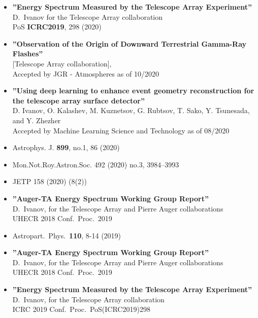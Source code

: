 \documentclass[12pt,letterpaper]{article} %
\begin{document}
{
\begin{itemize}
	
	\item {\bf ''Energy Spectrum Measured by the Telescope Array Experiment''}
	\\{}D.~Ivanov for the Telescope Array collaboration
	\\PoS \textbf{ICRC2019}, 298 (2020)

	\item {\bf ''Observation of the Origin of Downward Terrestrial Gamma-Ray Flashes''}
	\\{}[Telescope Array collaboration],
    \\{} Accepted by JGR - Atmospheres as of 10/2020 
	
	\item {\bf ''Using deep learning to enhance event geometry reconstruction for the telescope array surface detector''}
	\\{}D. Ivanov, O. Kalashev, M. Kuznetsov, G. Rubtsov, T. Sako, Y. Tsunesada, and Y. Zhezher
	\\{} Accepted by Machine Learning Science and Technology as of 08/2020

	\item{}Astrophys. J. \textbf{899}, no.1, 86 (2020)	
	\item Mon.Not.Roy.Astron.Soc. 492 (2020) no.3,  3984–3993
	\item JETP 158 (2020) (8(2))
	
	\item {\bf ''Auger-TA Energy Spectrum Working Group Report''}
	\\{}D.~Ivanov, for the Telescope Array and Pierre Auger collaborations
	\\{}UHECR 2018 Conf.\ Proc.\ 2019
	
	\item Astropart.\ Phys.\  {\bf 110}, 8-14 (2019)
	
	\item {\bf ''Auger-TA Energy Spectrum Working Group Report''}
    \\{}D.~Ivanov, for the Telescope Array and Pierre Auger collaborations
    \\{}UHECR 2018 Conf.\ Proc.\ 2019
	
	\item {\bf ''Energy Spectrum Measured by the Telescope Array Experiment''}
	\\{}D.~Ivanov, for the Telescope Array collaboration
	\\{}ICRC 2019 Conf.\ Proc.\ PoS(ICRC2019)298
	

\end{itemize}}
\end{document}
